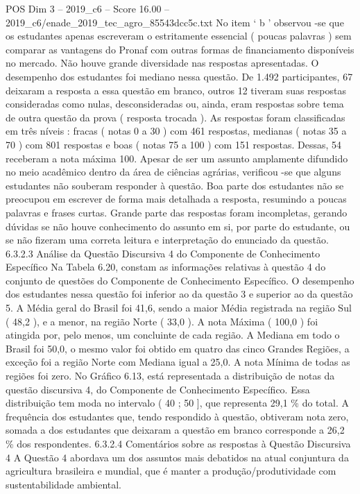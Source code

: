 \begin{textsample}{POS Dim 3 – 2019\_c6 – Score 16.00 – 2019\_c6/enade\_2019\_tec\_agro\_85543dcc5c.txt}
No item ‘ b ’ observou -se que os estudantes apenas escreveram o estritamente essencial ( poucas palavras ) sem comparar as vantagens do Pronaf com outras formas de financiamento disponíveis no mercado.
Não houve grande diversidade nas respostas apresentadas.
O desempenho dos estudantes foi mediano nessa questão.
De 1.492 participantes, 67 deixaram a resposta a essa questão em branco, outros 12 tiveram suas respostas consideradas como nulas, desconsideradas ou, ainda, eram respostas sobre tema de outra questão da prova ( resposta trocada ).
As respostas foram classificadas em três níveis : fracas ( notas 0 a 30 ) com 461 respostas, medianas ( notas 35 a 70 ) com 801 respostas e boas ( notas 75 a 100 ) com 151 respostas.
Dessas, 54 receberam a nota máxima 100.
Apesar de ser um assunto amplamente difundido no meio acadêmico dentro da área de ciências agrárias, verificou -se que alguns estudantes não souberam responder à questão.
Boa parte dos estudantes não se preocupou em escrever de forma mais detalhada a resposta, resumindo a poucas palavras e frases curtas.
Grande parte das respostas foram incompletas, gerando dúvidas se não houve conhecimento do assunto em si, por parte do estudante, ou se não fizeram uma correta leitura e interpretação do enunciado da questão. 6.3.2.3 Análise da Questão Discursiva 4 do Componente de Conhecimento Específico Na Tabela 6.20, constam as informações relativas à questão 4 do conjunto de questões do Componente de Conhecimento Específico.
O desempenho dos estudantes nessa questão foi inferior ao da questão 3 e superior ao da questão 5.
A Média geral do Brasil foi 41,6, sendo a maior Média registrada na região Sul ( 48,2 ), e a menor, na região Norte ( 33,0 ).
A nota Máxima ( 100,0 ) foi atingida por, pelo menos, um concluinte de cada região.
A Mediana em todo o Brasil foi 50,0, o mesmo valor foi obtido em quatro das cinco Grandes Regiões, a exceção foi a região Norte com Mediana igual a 25,0.
A nota Mínima de todas as regiões foi zero.
No Gráfico 6.13, está representada a distribuição de notas da questão discursiva 4, do Componente de Conhecimento Específico.
Essa distribuição tem moda no intervalo ( 40 ; 50 ], que representa 29,1 \% do total.
A frequência dos estudantes que, tendo respondido à questão, obtiveram nota zero, somada a dos estudantes que deixaram a questão em branco corresponde a 26,2 \% dos respondentes. 6.3.2.4 Comentários sobre as respostas à Questão Discursiva 4 A Questão 4 abordava um dos assuntos mais debatidos na atual conjuntura da agricultura brasileira e mundial, que é manter a produção/produtividade com sustentabilidade ambiental.

\end{textsample}
